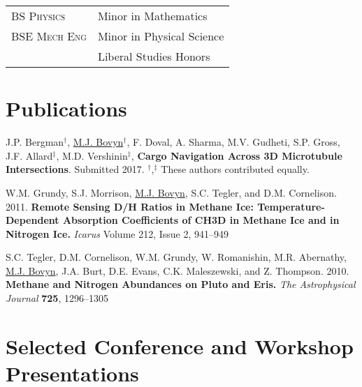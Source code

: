 \documentclass[letterpaper,10pt]{article} %
\begin{document}
\begin{tabular}{R{3cm} | l}

\textsc{BS Physics}& Minor in Mathematics \\
\textsc{BSE Mech Eng} & Minor in Physical Science\\
 & Liberal Studies Honors\\

\end{tabular}


\section{Publications}

J.P. Bergman$^\dagger$, \underline{M.J. Bovyn}$^\dagger$, F. Doval, A. Sharma, M.V. Gudheti, S.P. Gross, J.F. Allard$^\ddagger$, M.D. Vershinin$^\ddagger$, \textbf{Cargo Navigation Across 3D Microtubule Intersections}. Submitted 2017. $^\dagger$,$^\ddagger$ These authors contributed equally.

W.M. Grundy, S.J. Morrison, \underline{M.J. Bovyn}, S.C. Tegler, and D.M. Cornelison. 2011. \textbf{Remote Sensing D/H Ratios in Methane Ice: Temperature-Dependent Absorption Coefficients of CH3D in Methane Ice and in Nitrogen Ice.} \textit{Icarus} Volume 212, Issue 2, 941--949

S.C. Tegler, D.M. Cornelison, W.M. Grundy, W. Romanishin, M.R. Abernathy, \underline{M.J. Bovyn}, J.A. Burt, D.E. Evans, C.K. Maleszewski, and Z. Thompson. 2010. \textbf{Methane and Nitrogen Abundances on Pluto and Eris.} \textit{The Astrophysical Journal} \textbf{725}, 1296--1305


\section*{Selected Conference and Workshop Presentations}
\end{document}
